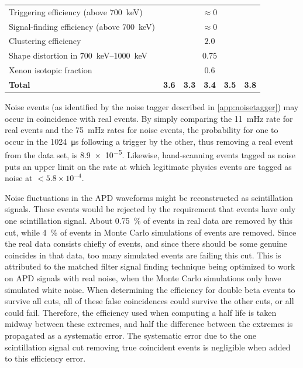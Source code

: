 \documentclass[herrin-thesis.tex]{subfiles}
\begin{document}
\begin{table}[tbp]
\begin{tabular}{p{} c c c c c}
Triggering efficiency	(above \SI{700}{\keV})			&	\multicolumn{5}{c}{\(\approx 0\)}			\\
Signal-finding efficiency (above \SI{700}{\keV})		&	\multicolumn{5}{c}{\(\approx 0\)}			\\
Clustering efficiency								&	\multicolumn{5}{c}{\(2.0\)}	\\
Shape distortion in \SIrange{700}{1000}{\keV}			&	\multicolumn{5}{c}{0.75}					\\
Xenon isotopic fraction							&	\multicolumn{5}{c}{0.6}					\\\midrule
\textbf{Total}									&\textbf{3.6}&\textbf{3.3}&\textbf{3.4}&\textbf{3.5}&\textbf{3.8}\\\bottomrule
\end{tabular}
\end{table}

Noise events (as identified by the noise tagger described in \cref{app:noisetagger}) may occur in coincidence with real events. By simply comparing the \SI{11}{\milli\Hz} rate for real events and the \SI{75}{\milli\Hz} rates for noise events, the probability for one to occur in the \SI{1024}{\micro\s} following a trigger by the other, thus removing a real event from the data set, is \num{8.9e-5}. Likewise, hand-scanning events tagged as noise puts an upper limit on the rate at which legitimate physics events are tagged as noise at \(< 5.8\times10^{-4}\).

Noise fluctuations in the APD waveforms might be reconstructed as scintillation signals. These events would be rejected by the requirement that events have only one scintillation signal. About \SI{0.75}{\percent} of events in real data are removed by this cut, while \about{}\SI{4}{\percent} of events in Monte Carlo simulations of \twonu{} events are removed. Since the real data consists chiefly of \twonu{} events, and since there should be some genuine coincides in that data, too many simulated events are failing this cut. This is attributed to the matched filter signal finding technique being optimized to work on APD signals with real noise, when the Monte Carlo simulations only have simulated white noise. When determining the efficiency for double beta events to survive all cuts, all of these false coincidences could survive the other cuts, or all could fail. Therefore, the efficiency used when computing a half life is taken midway between these extremes, and half the difference between the extremes is propagated as a systematic error. The systematic error due to the one scintillation signal cut removing true coincident events is negligible when added to this efficiency error.
\end{document}
